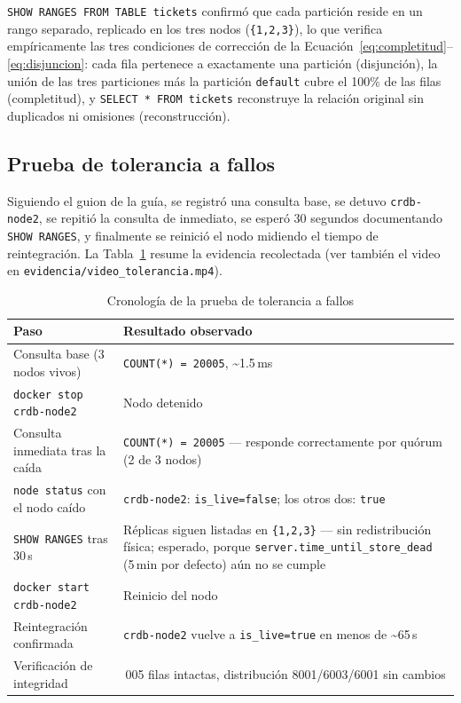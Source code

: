 \documentclass[11pt,a4paper]{article}
\begin{document}
\texttt{SHOW RANGES FROM TABLE tickets} confirmó que cada partición reside en
un rango separado, replicado en los tres nodos (\texttt{\{1,2,3\}}), lo que
verifica empíricamente las tres condiciones de corrección de la
Ecuación~\ref{eq:completitud}--\ref{eq:disjuncion}: cada fila pertenece a
exactamente una partición (disjunción), la unión de las tres particiones más
la partición \texttt{default} cubre el 100\% de las filas (completitud), y
\texttt{SELECT * FROM tickets} reconstruye la relación original sin
duplicados ni omisiones (reconstrucción).

\subsection{Prueba de tolerancia a fallos}
\label{sec:tolerancia}

Siguiendo el guion de la guía, se registró una consulta base, se detuvo
\texttt{crdb-node2}, se repitió la consulta de inmediato, se esperó 30
segundos documentando \texttt{SHOW RANGES}, y finalmente se reinició el nodo
midiendo el tiempo de reintegración. La Tabla~\ref{tab:tolerancia} resume la
evidencia recolectada (ver también el video en
\texttt{evidencia/video\_tolerancia.mp4}).

\begin{table}[H]
\centering
\caption{Cronología de la prueba de tolerancia a fallos}
\label{tab:tolerancia}
\begin{tabular}{@{}>{\raggedright\arraybackslash}p{4cm}>{\raggedright\arraybackslash}p{9cm}@{}}
\toprule
Paso & Resultado observado \\
\midrule
Consulta base (3 nodos vivos) & \texttt{COUNT(*) = 20005}, \textasciitilde{}1.5\,ms \\
\texttt{docker stop crdb-node2} & Nodo detenido \\
Consulta inmediata tras la caída & \texttt{COUNT(*) = 20005} --- responde correctamente por quórum (2 de 3 nodos) \\
\texttt{node status} con el nodo caído & \texttt{crdb-node2}: \texttt{is\_live=false}; los otros dos: \texttt{true} \\
\texttt{SHOW RANGES} tras 30\,s & Réplicas siguen listadas en \texttt{\{1,2,3\}} --- sin redistribución física; esperado, porque \texttt{server.time\_until\_store\_dead} (5\,min por defecto) aún no se cumple \\
\texttt{docker start crdb-node2} & Reinicio del nodo \\
Reintegración confirmada & \texttt{crdb-node2} vuelve a \texttt{is\_live=true} en menos de \textasciitilde{}65\,s \\
Verificación de integridad & 20\,005 filas intactas, distribución 8001/6003/6001 sin cambios \\
\bottomrule
\end{tabular}
\end{table}
\end{document}
